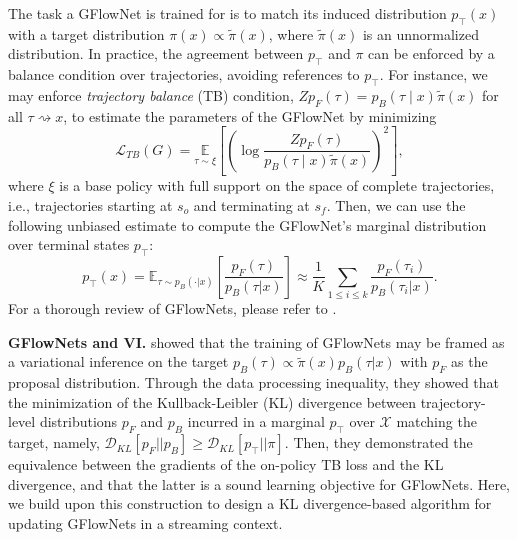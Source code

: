 \documentclass{article}
\newcommand{\pp}[1]{\vspace{0pt}\noindent\textbf{#1}}
\theoremstyle{plain}
\theoremstyle{definition}
\theoremstyle{remark}
\theoremstyle{remark}
\begin{document}

The task a GFlowNet is trained for is to match its induced distribution $p_{\top}(x)$ with a target distribution $\pi(x) \propto \tilde{\pi}(x)$, where $\tilde{\pi}(x)$ is an unnormalized distribution.
In practice, the agreement between $p_{\top}$ and $\pi$ can be enforced by a balance condition over trajectories, avoiding references to $p_{\top}$.
For instance, we may enforce \textit{trajectory balance} (TB) condition, $Z p_{F}(\tau) = p_{B}(\tau\mid x) \tilde{\pi}(x)$ for all $\tau\rightsquigarrow x$, to estimate the parameters of the GFlowNet by minimizing
\begin{equation} \label{eq:training} 
    \mathcal{L}_{TB}(G) = \! 
    \underset{\tau \sim \xi}{\mathbb{E}}\left[ 
        \left( \! \log \frac{Z p_{F}(\tau)}{p_{B}(\tau\mid x) \tilde{\pi}(x)} \! \right)^{2} 
    \right], 
\end{equation}
where $\xi$ is a base policy with full support on the space of complete trajectories, i.e., trajectories starting at $s_o$ and terminating at $s_f$.
Then, we can use the following unbiased estimate to compute the GFlowNet's marginal distribution over terminal states $p_{\top}$:
\begin{equation} \label{eq:aem}
   p_{\top}(x) = \mathbb{E}_{\tau \sim p_{B}(\cdot | x)} \left[ \frac{p_{F}(\tau)}{p_{B}(\tau | x)}\right] \approx \frac{1}{K} \sum_{1 \le i \le k} \frac{p_{F}(\tau_{i})}{p_{B}(\tau_{i} | x)}.
\end{equation}
% 
For a thorough review of GFlowNets, please refer to \cite{Foundations}.

\pp{GFlowNets and VI.}
\citet{malkin2023gflownets} showed that the training of GFlowNets may be framed as a variational inference on the target $p_{B}(\tau) \propto \tilde{\pi}(x) p_{B}(\tau | x)$ with $p_{F}$ as the proposal distribution.
Through the data processing inequality, they showed that the minimization of the Kullback-Leibler (KL) divergence between trajectory-level distributions $p_{F}$ and $p_{B}$ incurred in a marginal $p_{\top}$ over $\mathcal{X}$ matching the target, namely, $\mathcal{D}_{KL}[p_{F}||p_{B}] \ge \mathcal{D}_{KL}[p_{\top} || \pi]$.
Then, they demonstrated the equivalence between the gradients of the on-policy TB loss and the KL divergence, and that the latter is a sound learning objective for GFlowNets.
Here, we build upon this construction to design a KL divergence-based algorithm for updating GFlowNets in a streaming context. 
\end{document}

